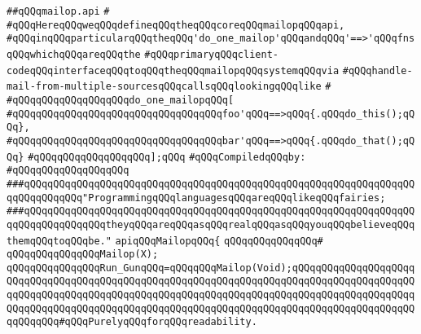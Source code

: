 \label{src/lib/src/lib/thread-kit/src/core-thread-kit/mailop.api}
\verb|##qQQqmailop.api|\newline
\verb|#|\newline
\verb|#qQQqHereqQQqweqQQqdefineqQQqtheqQQqcoreqQQqmailopqQQqapi,|\newline
\verb|#qQQqinqQQqparticularqQQqtheqQQq'do_one_mailop'qQQqandqQQq'==>'qQQqfnsqQQqwhichqQQqareqQQqthe|\newline
\verb|#qQQqprimaryqQQqclient-codeqQQqinterfaceqQQqtoqQQqtheqQQqmailopqQQqsystemqQQqvia|\newline
\verb|#qQQqhandle-mail-from-multiple-sourcesqQQqcallsqQQqlookingqQQqlike|\newline
\verb|#|\newline
\verb|#qQQqqQQqqQQqqQQqqQQqdo_one_mailopqQQq[|\newline
\verb|#qQQqqQQqqQQqqQQqqQQqqQQqqQQqqQQqqQQqfoo'qQQq==>qQQq{.qQQqdo_this();qQQq},|\newline
\verb|#qQQqqQQqqQQqqQQqqQQqqQQqqQQqqQQqqQQqbar'qQQq==>qQQq{.qQQqdo_that();qQQq}|\newline
\verb|#qQQqqQQqqQQqqQQqqQQq];qQQq|\newline
\newline
\verb|#qQQqCompiledqQQqby:|\newline
\verb|#qQQqqQQqqQQqqQQqqQQq|\newline
\newline
\newline
\newline
\verb|###qQQqqQQqqQQqqQQqqQQqqQQqqQQqqQQqqQQqqQQqqQQqqQQqqQQqqQQqqQQqqQQqqQQqqQQqqQQqqQQq"ProgrammingqQQqlanguagesqQQqareqQQqlikeqQQqfairies;|\newline
\verb|###qQQqqQQqqQQqqQQqqQQqqQQqqQQqqQQqqQQqqQQqqQQqqQQqqQQqqQQqqQQqqQQqqQQqqQQqqQQqqQQqqQQqtheyqQQqareqQQqasqQQqrealqQQqasqQQqyouqQQqbelieveqQQqthemqQQqtoqQQqbe."|\newline
\newline
\newline
\newline
\verb|apiqQQqMailopqQQq{|\newline
\verb|qQQqqQQqqQQqqQQq#|\newline
\verb|qQQqqQQqqQQqqQQqMailop(X);|\newline
\newline
\verb|qQQqqQQqqQQqqQQqRun_GunqQQq=qQQqqQQqMailop(Void);qQQqqQQqqQQqqQQqqQQqqQQqqQQqqQQqqQQqqQQqqQQqqQQqqQQqqQQqqQQqqQQqqQQqqQQqqQQqqQQqqQQqqQQqqQQqqQQqqQQqqQQqqQQqqQQqqQQqqQQqqQQqqQQqqQQqqQQqqQQqqQQqqQQqqQQqqQQqqQQqqQQqqQQqqQQqqQQqqQQqqQQqqQQqqQQqqQQqqQQqqQQqqQQqqQQqqQQqqQQqqQQqqQQqqQQqqQQqqQQq#qQQqPurelyqQQqforqQQqreadability.|\newline
